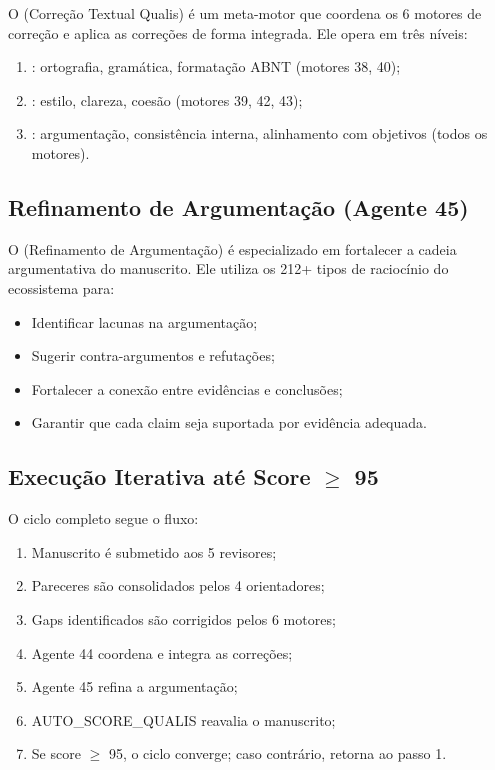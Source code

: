 O  (Correção Textual Qualis) é um meta-motor que coordena
os 6 motores de correção e aplica as correções de forma integrada. Ele opera
em três níveis:

\begin{enumerate}
\item {}: ortografia, gramática,
      formatação ABNT (motores 38, 40);
\item {}: estilo, clareza, coesão
      (motores 39, 42, 43);
\item {}: argumentação, consistência
      interna, alinhamento com objetivos (todos os motores).
\end{enumerate}

\subsection{Refinamento de Argumentação (Agente 45)}

O  (Refinamento de Argumentação) é especializado em
fortalecer a cadeia argumentativa do manuscrito. Ele utiliza os 212+ tipos
de raciocínio do ecossistema para:

\begin{itemize}
\item Identificar lacunas na argumentação;
\item Sugerir contra-argumentos e refutações;
\item Fortalecer a conexão entre evidências e conclusões;
\item Garantir que cada claim seja suportada por evidência adequada.
\end{itemize}

\subsection{Execução Iterativa até Score $\geq$ 95}

O ciclo completo segue o fluxo:

\begin{enumerate}
\item Manuscrito é submetido aos 5 revisores;
\item Pareceres são consolidados pelos 4 orientadores;
\item Gaps identificados são corrigidos pelos 6 motores;
\item Agente 44 coordena e integra as correções;
\item Agente 45 refina a argumentação;
\item AUTO\_SCORE\_QUALIS reavalia o manuscrito;
\item Se score $\geq$ 95, o ciclo converge; caso contrário, retorna ao passo 1.
\end{enumerate}

